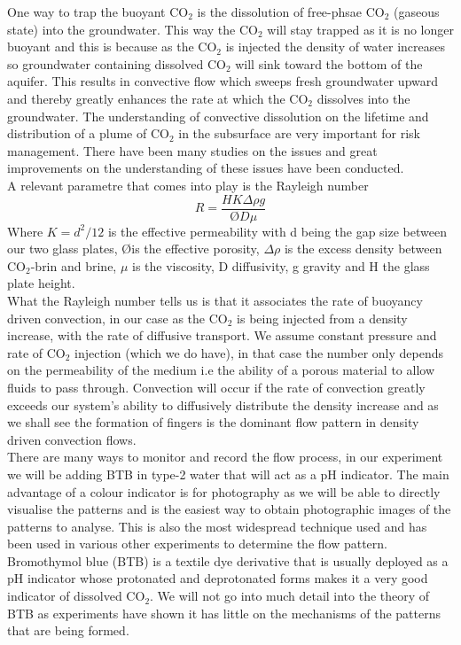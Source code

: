 \documentclass[twoside]{article}
\begin{document}
\begin{multicols}{2}
One way to trap the buoyant CO$_2$ is the dissolution of free-phsae CO$_2$ (gaseous state) into the groundwater. This way the CO$_2$ will stay trapped as it is no longer buoyant and this is because as the CO$_2$ is injected the density of water increases so groundwater containing dissolved CO$_2$ will sink toward the bottom of the aquifer. This results in convective flow which sweeps fresh groundwater upward and thereby greatly enhances the rate at which the CO$_2$ dissolves into the groundwater\cite{groundwater}. The understanding of convective dissolution on the lifetime and distribution of a plume of CO$_2$ in the subsurface are very important for risk management. There have been many studies on the issues and great improvements on the understanding of these issues have been conducted. \\
A relevant parametre that comes into play is the Rayleigh number 
$$R = \frac{HK\Delta \rho g}{\text{\O} D \mu}$$
Where $K=d^2/12$ is the effective permeability with d being the gap size between our two glass plates, \O \space is the effective porosity, $\Delta \rho$ is the excess density between CO$_2$-brin and brine, $\mu$ is the viscosity, D diffusivity, g gravity and H the glass plate height.\\ What the Rayleigh number tells us is that it associates the rate of buoyancy driven convection, in our case as the CO$_2$ is being injected from a density increase, with the rate of diffusive transport. We assume constant pressure and rate of CO$_2$ injection (which we do have), in that case the number only depends on the permeability of the medium i.e the ability of a porous material to allow fluids to pass through. Convection will occur if the rate of convection greatly exceeds our system's ability to diffusively distribute the density increase and as we shall see the formation of fingers is the dominant flow pattern in density driven convection flows\cite{Hassan07}.\\
There are many ways to monitor and record the flow process, in our experiment we will be adding BTB in type-2 water that will act as a pH indicator. The main advantage of a colour indicator is for photography as we will be able to directly visualise the patterns and is the easiest way to obtain photographic images of the patterns to analyse. This is also the most widespread technique used and has been used in various other experiments to determine the flow pattern. \\
Bromothymol blue (BTB) is a textile dye derivative that is usually deployed as a pH indicator whose protonated and deprotonated forms makes it a very good indicator of dissolved CO$_2$. We will not go into much detail into the theory of BTB as experiments have shown it has little on the mechanisms of the patterns that are being formed\cite{BTB}.


\end{multicols}
\end{document}

